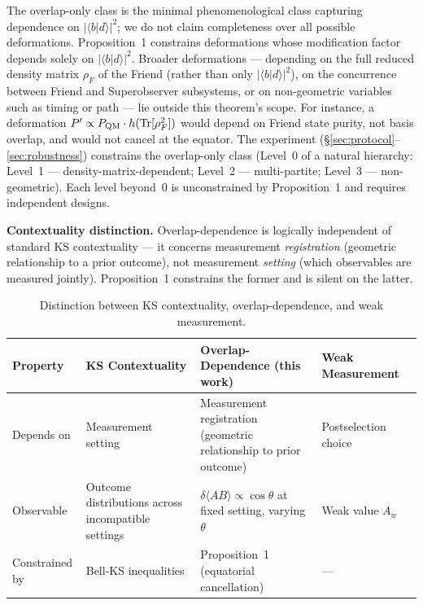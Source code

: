 \documentclass[twocolumn,aps,pra,superscriptaddress,floatfix,10pt]{revtex4-2}
\begin{document}
The overlap-only class is the minimal phenomenological
class capturing dependence on $|\langle b|d\rangle|^2$; we do not claim completeness over all
possible deformations. Proposition~1 constrains deformations whose
modification factor depends solely on $|\langle b|d\rangle|^2$. Broader deformations ---
depending on the full reduced density matrix $\rho_F$ of the Friend (rather than
only $|\langle b|d\rangle|^2$), on the concurrence between Friend and Superobserver
subsystems, or on non-geometric variables such as timing or path --- lie
outside this theorem's scope. For instance, a deformation
$P' \propto P_{\rm QM} \cdot h(\text{Tr}[\rho_F^2])$ would depend on Friend state purity, not basis
overlap, and would not cancel at the equator. The experiment (\S\ref{sec:protocol}--\ref{sec:robustness}) constrains the overlap-only class (Level~0 of a
natural hierarchy: Level~1 --- density-matrix-dependent; Level~2 ---
multi-partite; Level~3 --- non-geometric). Each level beyond~0 is
unconstrained by Proposition~1 and requires independent designs.

\textbf{Contextuality distinction.} Overlap-dependence is logically independent
of standard KS contextuality --- it concerns measurement \emph{registration}
(geometric relationship to a prior outcome), not measurement \emph{setting}
(which observables are measured jointly). Proposition~1 constrains the
former and is silent on the latter.

\begin{table}[H]
\centering
\caption{Distinction between KS contextuality, overlap-dependence, and weak measurement.}
\label{tab:contextuality}
\begin{tabular}{p{}p{}p{}}
\toprule
Property & KS Contextuality & Overlap-Dependence (this work) & Weak Measurement~\cite{Aharonov1988} \\
\midrule
Depends on & Measurement setting & Measurement registration (geometric relationship to prior outcome) & Postselection choice \\
Observable & Outcome distributions across incompatible settings & $\delta\langle AB\rangle \propto \cos\theta$ at fixed setting, varying $\theta$ & Weak value $A_w$ \\
Constrained by & Bell-KS inequalities & Proposition~1 (equatorial cancellation) & --- \\
\bottomrule
\end{tabular}
\end{table}
\end{document}
